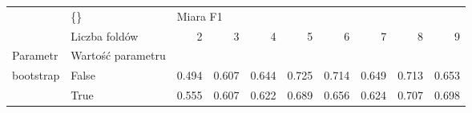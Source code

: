 \begin{tabular}{llrrrrrrrr}
\hline
          & \{\} & \multicolumn{8}{l}{Miara F1} \\
          & Liczba foldów &        2 &      3 &      4 &      5 &      6 &      7 &      8 &      9 \\
Parametr & Wartość parametru &          &        &        &        &        &        &        &        \\
\hline
bootstrap & False &    0.494 &  0.607 &  0.644 &  0.725 &  0.714 &  0.649 &  0.713 &  0.653 \\
          & True &    0.555 &  0.607 &  0.622 &  0.689 &  0.656 &  0.624 &  0.707 &  0.698 \\
\hline
\end{tabular}
